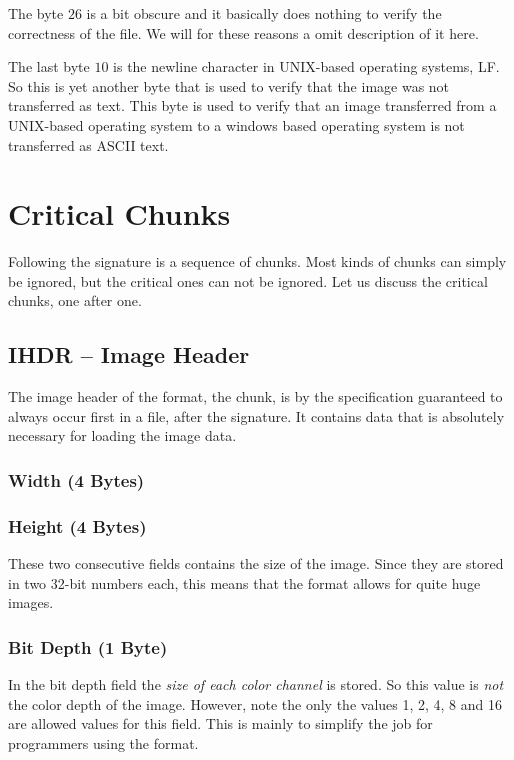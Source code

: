 The byte $26$ is a bit obscure and it basically does nothing to verify
the correctness of the file. We will for these reasons a omit
description of it here.

The last byte $10$ is the newline character in UNIX-based operating
systems, LF. So this is yet another byte that is used to verify that
the image was not transferred as text. This byte is used to verify
that an image transferred from a UNIX-based operating system to a
windows based operating system is not transferred as ASCII text.

\section{Critical Chunks}

Following the \png signature is a sequence of chunks. Most kinds of
chunks can simply be ignored, but the critical ones can not be
ignored. Let us discuss the critical chunks, one after one.

\subsection{IHDR -- Image Header}

The image header of the \png format, the  chunk, is by the
\png specification guaranteed to always occur first in a \png file,
after the \png signature. It contains data that is absolutely necessary
for loading the image data.

\subsubsection*{Width (4 Bytes)}
\subsubsection*{Height (4 Bytes)}

These two consecutive fields contains the size of the image. Since
they are stored in two 32-bit numbers each, this means that the \png
format allows for quite huge images.

\subsubsection*{Bit Depth (1 Byte)}

In the bit depth field the \textit{size of each color channel} is
stored. So this value is \textit{not} the color depth of the
image. However, note the only the values 1, 2, 4, 8 and 16 are allowed
values for this field. This is mainly to simplify the job for
programmers using the \png format.

